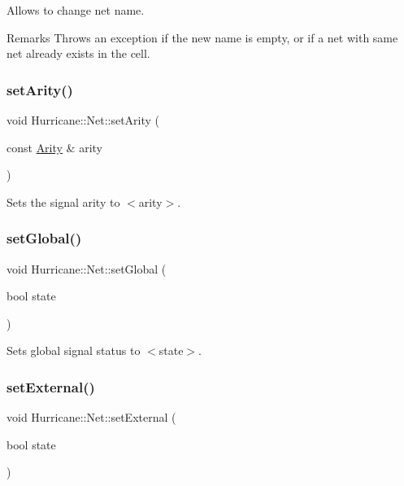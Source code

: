 Allows to change net name.

\begin{DoxyRemark}{Remarks}
Throws an exception if the new name is empty, or if a net with same net already exists in the cell. 
\end{DoxyRemark}
\mbox{\label{classHurricane_1_1Net_af5dfdca4401902ee7e1e46a1a486da38}} 
\subsubsection{\texorpdfstring{set\+Arity()}{setArity()}}
{\footnotesize\ttfamily void Hurricane\+::\+Net\+::set\+Arity (\begin{DoxyParamCaption}\item[{const \mbox{\hyperlink{classHurricane_1_1Net_a3a242d929e0c733f90f3f69be8cc427b}{Arity}} \&}]{arity }\end{DoxyParamCaption})}

Sets the signal arity to {\ttfamily $<$arity$>$}. \mbox{\label{classHurricane_1_1Net_a35c84afd9dade0cb715602bcf8ec8865}} 
\subsubsection{\texorpdfstring{set\+Global()}{setGlobal()}}
{\footnotesize\ttfamily void Hurricane\+::\+Net\+::set\+Global (\begin{DoxyParamCaption}\item[{bool}]{state }\end{DoxyParamCaption})}

Sets global signal status to {\ttfamily $<$state$>$}. \mbox{\label{classHurricane_1_1Net_a6a30bc8282ce7e4b936e73a11549fedf}} 
\subsubsection{\texorpdfstring{set\+External()}{setExternal()}}
{\footnotesize\ttfamily void Hurricane\+::\+Net\+::set\+External (\begin{DoxyParamCaption}\item[{bool}]{state }\end{DoxyParamCaption})}

